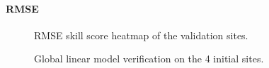 \paragraph{RMSE}
\begin{figure}[htb!]
    \centering
    
\caption{RMSE skill score heatmap of the validation sites.}
\end{figure}


\begin{figure}[htb!]
    \centering
    
\caption{Global linear model verification on the 4 initial sites.}
\end{figure}